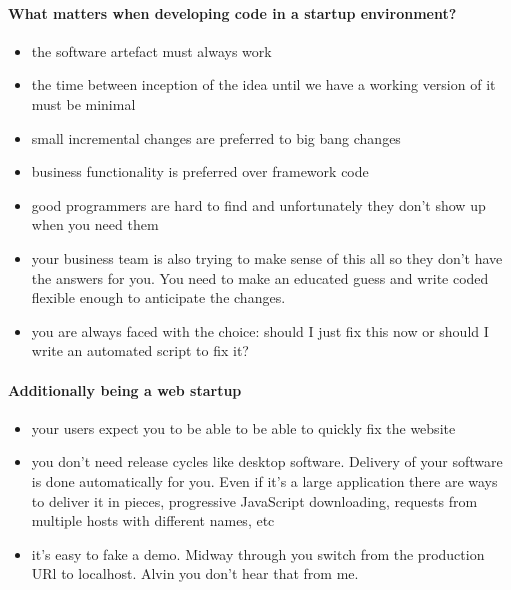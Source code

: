 \documentclass{article}
\begin{document}
\paragraph{What matters when developing code in a startup
  environment?}
\begin{itemize}
\item the software artefact must always work

\item the time between inception of the idea until we have a working
  version of it must be minimal

\item  small incremental changes are preferred to big bang changes

\item  business functionality is preferred over framework code

\item  good programmers are hard to find and unfortunately they don't
  show up when you need them

\item  your business team is also trying to make sense of this all so
  they don't have the answers for you. You need to make an
  educated guess and write coded flexible enough to anticipate
  the changes.

\item  you are always faced with the choice: should I just fix this
  now or should I write an automated script to fix it?
\end{itemize}


\paragraph{Additionally being a web startup}
\begin{itemize}
\item  your users expect you to be able to be able to quickly fix the
website

\item  you don't need release cycles like desktop software. Delivery
  of your software is done automatically for you. Even if it's a
  large application there are ways to deliver it in pieces,
  progressive JavaScript downloading, requests from multiple
  hosts with different names, etc

\item  it's easy to fake a demo. Midway through you switch from the
  production URl to localhost. Alvin you don't hear that from me.
\end{itemize}
\end{document}
